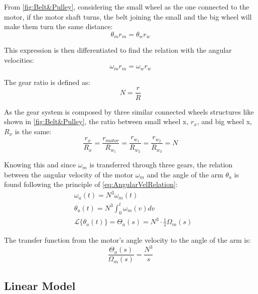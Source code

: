 From \autoref{fig:Belt&Pulley}, considering the small wheel as the one connected to the motor, if the motor shaft turns, the belt joining the small and the big wheel will make them turn the same distance:
\begin{equation}
	\theta_m r_m = \theta_w r_w
\end{equation}

This expression is then differentiated to find the relation with the angular velocities:
\begin{equation}
	\omega_m r_m = \omega_w r_w
	\label{eq:AngularVelRelation}
\end{equation}

The gear ratio is defined as: 
\begin{equation}
	N = \frac{r}{R}
	\label{eq:GearRatio}
\end{equation}

As the gear system is composed by three similar connected wheels structures like shown in \autoref{fig:Belt&Pulley}, the ratio between small wheel x, $r_x$, and big wheel x, $R_x$ is the same:
\begin{equation}
	\frac{r_x}{R_x} = \frac{r_{motor}}{R_{w_1}} = \frac{r_{w_1}}{R_{w_2}} = \frac{r_{w_2}}{R_{w_3}} = N
\end{equation}

Knowing this and since $\omega_m$ is transferred through three gears, the relation between the angular velocity of the motor $\omega_m$ and the angle of the arm $\theta_a$ is found following the principle of \autoref{eq:AngularVelRelation}:
\begin{subequations} \label{eq:tech_ToA}
	\begin{flalign}
		&\omega_a(t) = N^3 \omega_m(t) \\
		&\theta_a(t) = N^3 \int_{0}^{t}\omega_m(v) dv \\
		&\mathcal{L}\{\theta_a(t)\} = \Theta_a(s) = N^3 \cdot \frac{1}{s} \Omega_m(s)
	\end{flalign}
\end{subequations}

The transfer function from the motor's angle velocity to the angle of the arm is:
\begin{equation}\label{eq:thetaOmega}
	\frac{\Theta_a(s)}{\Omega_m(s)} =  \frac{N^3}{s}
\end{equation}

\subsection{Linear Model}

